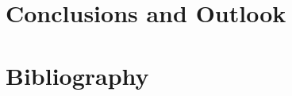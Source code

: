 \documentclass[a4paper, twoside, notitlepage]{report}
\begin{document}
\chapter{Conclusions and Outlook}\label{ch:conclusion}


\clearpage
\chapter*{Bibliography}

\printbibliography[heading=none]




\begin{appendices}

\renewcommand{\thesection}{\thechapter.\arabic{section}}
\renewcommand\thefigure{\thechapter.\arabic{figure}}
\renewcommand\theequation{\thechapter.\arabic{equation}}
 
\setcounter{equation}{0}
\setcounter{figure}{0}




 
\end{appendices}
\end{document}
